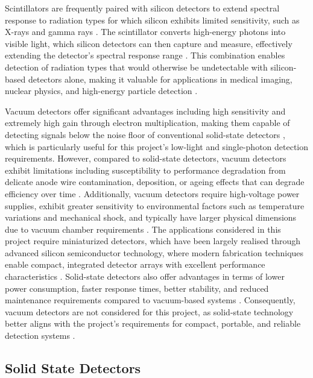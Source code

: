 \documentclass[12pt,a4paper,oneside]{report}
\begin{document}
Scintillators are frequently paired with silicon detectors to extend spectral response to radiation types for which silicon exhibits limited sensitivity, such as X-rays and gamma rays \cite{bass2010}. The scintillator converts high-energy photons into visible light, which silicon detectors can then capture and measure, effectively extending the detector's spectral response range \cite{bass2010}. This combination enables detection of radiation types that would otherwise be undetectable with silicon-based detectors alone, making it valuable for applications in medical imaging, nuclear physics, and high-energy particle detection \cite{bass2010}.

Vacuum detectors offer significant advantages including high sensitivity and extremely high gain through electron multiplication, making them capable of detecting signals below the noise floor of conventional solid-state detectors \cite{bass2010,kolanoski2020}, which is particularly useful for this project's low-light and single-photon detection requirements. However, compared to solid-state detectors, vacuum detectors exhibit limitations including susceptibility to performance degradation from delicate anode wire contamination, deposition, or ageing effects that can degrade efficiency over time \cite{kolanoski2020}. Additionally, vacuum detectors require high-voltage power supplies, exhibit greater sensitivity to environmental factors such as temperature variations and mechanical shock, and typically have larger physical dimensions due to vacuum chamber requirements \cite{bass2010,kolanoski2020}. The applications considered in this project require miniaturized detectors, which have been largely realised through advanced silicon semiconductor technology, where modern fabrication techniques enable compact, integrated detector arrays with excellent performance characteristics \cite{piron2020}. Solid-state detectors also offer advantages in terms of lower power consumption, faster response times, better stability, and reduced maintenance requirements compared to vacuum-based systems \cite{piron2020}. Consequently, vacuum detectors are not considered for this project, as solid-state technology better aligns with the project's requirements for compact, portable, and reliable detection systems \cite{piron2020}.

\subsection{Solid State Detectors}
\label{subsec:solid_state_detectors}
\end{document}
